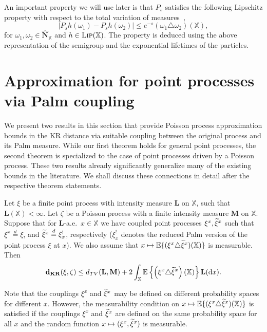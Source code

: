 \documentclass[AHL,Unicode,longabstracts]{cedram}
\newcommand*\bL{\mathbf{L}}
\newcommand*\bM{\mathbf{M}}
\newcommand*\bN{\mathbf{N}}
\newcommand*\dkr{\mathbf{d_{KR}}}
\newcommand*\X{\mathbb{X}}
\newcommand{\E}{\mathbb{E}}
\newcommand*\txi{\tilde{\xi}}
\newcommand*\cLip{\textsc{Lip}}
\newcommand*\md{\mathrm{d}}
\newcommand{\mean}[1] {\E\left\{{#1}\right\}}
\let\oldtilde\tilde
\renewcommand*{\tilde}[1]{\mathchoice{\widetilde{#1}}{\widetilde{#1}}{\oldtilde{#1}}{\oldtilde{#1}}}
\begin{document}
An important property we will use later is that $P_s$ satisfies the following Lipschitz property with respect to the total variation of measures~\cite[Lemma~5.2]{decreusefond_functional_2016},
\begin{equation}\label{e:pslip}
\left|P_sh(\omega_1) - P_sh(\omega_2)\right| \leq e^{-s}\left(\omega_1 \triangle \omega_2\right)(\X),
\end{equation}
for $\omega_1,\omega_2 \in \widehat{\bN}_{\X}$ and $h \in \cLip(\X)$. The property is deduced using the above representation of the semigroup and the exponential lifetimes of the particles.

\section{Approximation for point processes via Palm coupling}\label{sec:Coupling}
We present two results in this section that provide Poisson process approximation bounds in the KR distance via suitable coupling between the original process and its Palm measure. While our first theorem holds for general point processes, the second theorem is specialized to the case of point processes driven by a Poisson process. These two results already significantly generalize many of the existing bounds in the literature. We shall discuss these connections in detail after the respective theorem statements.


\begin{theo}\label{t:gen_Poisson_approx}
Let $\xi$ be a finite point process with intensity measure $\bL$ on $\X$, such that $\bL(\X) < \infty$. Let $\zeta$ be a Poisson process with a finite intensity measure $\bM$ on $\X$. Suppose that for $\bL$-a.e.\ $x \in \X$ we have coupled point processes $\xi^{x},\txi^{x}$ such that $\xi^{x}\stackrel{d}{=}\xi$, and $\txi^{x}\stackrel{d}{=}\xi^{!}_{x}$, respectively ($\xi^{!}_{x}$ denotes the reduced Palm version of the point process $\xi$ at $x$). We also assume that $x\mapsto \E\{(\xi^{x} \triangle \txi^{x})(\X)\}$ is measurable. Then
\[
\dkr(\xi,\zeta) \leq d_{TV}(\bL,\bM) + 2 \int_{\X} \mean{\left(\xi^{x} \triangle \txi^{x}\right)(\X)}\bL(\md x).
\]
\end{theo}

\begin{rema}
Note that the couplings $\xi^x$ and $\tilde{\xi}^x$ may be defined on different probability spaces for different $x$. However, the measurability condition on $x\mapsto \E\{(\xi^{x} \triangle \txi^{x})(\X)\}$ is satisfied if the couplings $\xi^{x}$ and $\txi^{x}$ are defined on the same probability space for all {$x$} and the random function $x\mapsto (\xi^{x}, \txi^{x})$ is measurable.
\end{rema}
\end{document}
